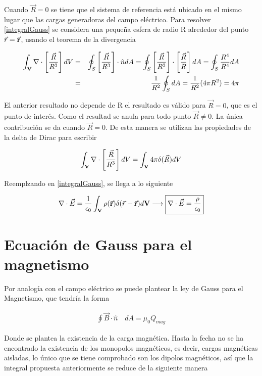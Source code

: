 Cuando $\vec{R} = 0$ se tiene que el sistema de referencia está ubicado en el mismo lugar que las cargas generadoras del campo eléctrico. Para resolver \eqref{integralGauss} se considera una pequeña esfera de radio R alrededor del punto $\vec{r}=\vec{\bf{r}}$, usando el teorema de la divergencia \cite{Arfken}

\begin{eqnarray}
    \int_{\bf{V}}\nabla\cdot\left[\frac{\vec{R}}{R^{3}}\right]dV &=& \oint_{S}\left[\frac{\vec{R}}{R^{3}}\right]\cdot\hat{n}dA = \oint_{S}\left[\frac{\vec{R}}{R^{3}}\right]\cdot\left[\frac{\vec{R}}{R}\right]dA = \oint_{S}\frac{R^{4}}{R^{4}}dA \\
    &=&\frac{1}{R^{2}}\oint_{S}dA = \frac{1}{R^{2}}(4\pi R^{2}) = 4\pi
\end{eqnarray}

El anterior resultado no depende de R el resultado es válido para $\vec{R} = 0$, que es el punto de interés. Como el resultad se anula para todo punto $\vec{R} \neq 0$. La única contribución se da cuando $\vec{R} = 0$. De esta manera se utilizan las propiedades de la delta de Dirac\cite{Arfken} para escribir 

\begin{eqnarray}
    \int_{\bf{V}}\nabla\cdot\left[\frac{\vec{R}}{R^{3}}\right]dV = \int_{\bf{V}}4\pi \delta(\vec{R})dV
\end{eqnarray}

Reemplzando en \eqref{integralGauss}, se llega a lo siguiente

\begin{eqnarray}
    \label{Leygauss}
    \nabla \cdot \vec{E} = \frac{1}{\epsilon_{0}}\int_{\bf{V}}\rho(\vec{\bf{r}})\delta(\vec{r}-\vec{\bf{r}})d\bf{V} \longrightarrow \boxed{ \nabla \cdot \vec{E} = \frac{\rho}{\epsilon_{0}}}
\end{eqnarray}

\section{Ecuación de Gauss para el magnetismo }


Por analogía con el campo eléctrico se puede plantear la ley de Gauss para el Magnetismo, que tendría la forma

\begin{eqnarray}
    \oint \vec{B}\cdot\hat{n}\quad dA = \mu_{0}Q_{mag}
\end{eqnarray}

Donde se plantea la existencia de la carga magnética. Hasta la fecha no se ha encontrado la existencia de los monopolos magnéticos, es decir, cargas magnéticas aisladas, lo único que se tiene comprobado son los dipolos magnéticos, así que la integral propuesta anteriormente se reduce de la siguiente manera

